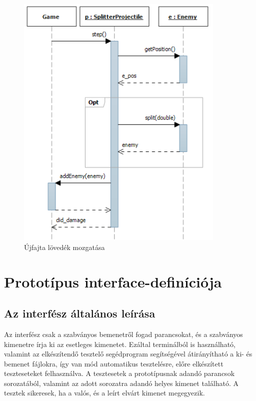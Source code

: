 \begin{figure}[H]
\begin{center}
\includegraphics[width=10cm]{images/ch07/splitterprojectile_step.png}
\caption{Újfajta lövedék mozgatása}
\label{fig:splitProjMove}
\end{center}
\end{figure}


\section{Prototípus interface-definíciója}

\subsection{Az interfész általános leírása}

Az interfész csak a szabványos bemenetről fogad parancsokat, és a szabványos kimenetre írja ki az esetleges kimenetet. Ezáltal terminálból is használható, valamint az elkészítendő tesztelő segédprogram segítségével átirányítható a ki- és bemenet fájlokra, így van mód automatikus tesztelésre, előre elkészített teszteseteket felhasználva. A tesztesetek a prototípusnak adandó parancsok sorozatából, valamint az adott sorozatra adandó helyes kimenet található. A tesztek sikeresek, ha a valós, és a leírt elvárt kimenet megegyezik.

